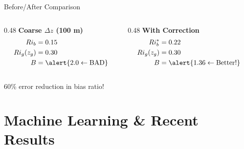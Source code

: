 \documentclass[10pt,aspectratio=169]{beamer}
\begin{document}
\begin{frame}{Before/After Comparison}
  \begin{columns}[T]
    \begin{column}{0.48\textwidth}
      \centering
      \textbf{Coarse $\Delta z$ (100 m)}
      \begin{align*}
        Ri_b &= 0.15 \\
        Ri_g(z_g) &= 0.30 \\
        B &= \alert{2.0 \leftarrow \text{BAD}}
      \end{align*}
    \end{column}
    \begin{column}{0.48\textwidth}
      \centering
      \textbf{With Correction}
      \begin{align*}
        Ri_b^* &= 0.22 \\
        Ri_g(z_g) &= 0.30 \\
        B &= \alert{1.36 \leftarrow \text{Better!}}
      \end{align*}
    \end{column}
  \end{columns}
  
  \vspace{0.5cm}
  \begin{center}
    \alert{60\% error reduction in bias ratio!}
  \end{center}
\end{frame}

\section{Machine Learning \& Recent Results}
\end{document}
